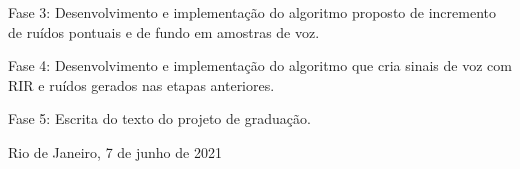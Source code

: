 \documentclass[a4paper,12pt,oneside,openany]{report}
\begin{document}
Fase 3: Desenvolvimento e implementação do algoritmo proposto \cite{Speech_Rec} de incremento de ruídos pontuais e de fundo em amostras de voz.

Fase 4: Desenvolvimento e implementação do algoritmo que cria sinais de voz com RIR e ruídos gerados nas etapas anteriores.

Fase 5: Escrita do texto do projeto de graduação.


 


\vspace{2cm}
\noindent
Rio de Janeiro, 7 de junho de 2021

\vspace{0.5cm}
\begin{flushright}
      \parbox{10cm}{
      \hrulefill

      \vspace{-.375cm}

      \vspace{0.9cm}
      \hrulefill

      \vspace{-.375cm}

      \vspace{0.9cm}
      }
\end{flushright}
\vfill
      
\end{document}
